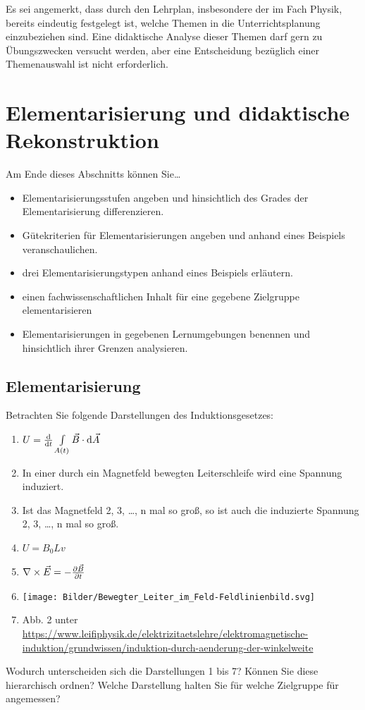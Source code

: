 \bip

Es sei angemerkt, dass durch den Lehrplan, insbesondere der im Fach Physik, bereits eindeutig festgelegt ist, welche Themen in die Unterrichtsplanung einzubeziehen sind. Eine didaktische Analyse dieser Themen darf gern zu \"{U}bungszwecken versucht werden, aber eine Entscheidung bez\"{u}glich einer Themenauswahl ist nicht erforderlich.

\bip\bip
\section{Elementarisierung und didaktische Rekonstruktion}\label{Elementarisierung}

\begin{ziele}
	Am Ende dieses Abschnitts können Sie\dots
	\begin{itemize}
		\item Elementarisierungsstufen angeben und hinsichtlich des Grades der Elementarisierung differenzieren.
		\item Gütekriterien für Elementarisierungen angeben und anhand eines Beispiels veranschaulichen.
		\item drei Elementarisierungstypen anhand eines Beispiels erläutern.
		\item einen fachwissenschaftlichen Inhalt für eine gegebene Zielgruppe elementarisieren
		\item Elementarisierungen in gegebenen Lernumgebungen benennen und hinsichtlich ihrer Grenzen analysieren.
	\end{itemize}	
\end{ziele}

\subsection{Elementarisierung}\label{Elementarisierung}

\begin{uea}
	Betrachten Sie folgende Darstellungen des Induktionsgesetzes:
	\begin{enumerate}
		\item $U = \dv{t} \int\limits_{A(t)} \vec{B}\cdot \dd{\vec{A}}$
		\item In einer durch ein Magnetfeld bewegten Leiterschleife wird eine Spannung induziert.
		\item Ist das Magnetfeld 2, 3, \dots, n mal so groß, so ist auch die induzierte Spannung 2, 3, \dots, n mal so groß.
		\item $U=B_0 L v$
		\item $\nabla\times\vec{E} = - \pdv{\vec{B}}{t}$
		\item \texttt{[image: Bilder/Bewegter\_Leiter\_im\_Feld-Feldlinienbild.svg]}
		\item Abb. 2 unter \url{https://www.leifiphysik.de/elektrizitaetslehre/elektromagnetische-induktion/grundwissen/induktion-durch-aenderung-der-winkelweite}
	\end{enumerate}
	Wodurch unterscheiden sich die Darstellungen 1 bis 7? Können Sie diese hierarchisch ordnen? Welche Darstellung halten Sie für welche Zielgruppe für angemessen?
\end{uea}

